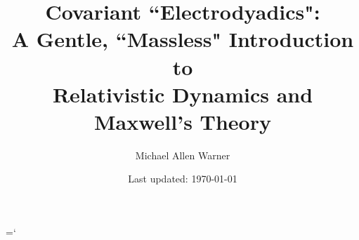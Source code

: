 \documentclass[12pt]{article}
\begin{document}
\title{Covariant ``Electrodyadics":\\A Gentle, ``Massless" Introduction to\\Relativistic Dynamics and Maxwell's Theory}
\author{Michael Allen Warner}
\date{Last updated: \today}

\begin{titlingpage}
\maketitle
\end{titlingpage}

\clearpage

\setcounter{page}{2}
\hyphenchar{} %
\tableofcontents
\hyphenchar\font=`\- %

\clearpage

{}
\end{document}
